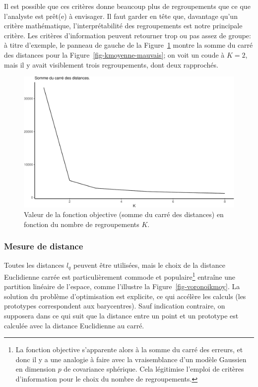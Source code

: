 \documentclass[
  11pt,
  letterpaper,
]{book}
\theoremstyle{definition}
\theoremstyle{remark}
\begin{document}
Il est possible que ces critères donne beaucoup plus de regroupements
que ce que l'analyste est prêt(e) à envisager. Il faut garder en tête
que, davantage qu'un critère mathématique, l'interprétabilité des
regroupements est notre principale critère. Les critères d'information
peuvent retourner trop ou pas assez de groupe: à titre d'exemple, le
panneau de gauche de la Figure~\ref{fig-coudekmoy} montre la somme du
carré des distances pour la Figure~\ref{fig-kmoyenne-mauvais}; on voit
un coude à \(K=2\), mais il y avait visiblement trois regroupements,
dont deux rapprochés.

\begin{figure}[ht!]

{\centering \includegraphics[width=1\textwidth,height=\textheight]{./03-regroupements_files/figure-pdf/fig-coudekmoy-1.pdf}

}

\caption{\label{fig-coudekmoy}Valeur de la fonction objective (somme du
carré des distances) en fonction du nombre de regroupements \(K\).}

\end{figure}

\hypertarget{mesure-de-distance}{%
\subsubsection*{Mesure de distance}\label{mesure-de-distance}}

Toutes les distances \(l_q\) peuvent être utilisées, mais le choix de la
distance Euclidienne carrée est particulièrement commode et
populaire\footnote{La fonction objective s'apparente alors à la somme du
  carré des erreurs, et donc il y a une analogie à faire avec la
  vraisemblance d'un modèle Gaussien en dimension \(p\) de covariance
  sphérique. Cela légitimise l'emploi de critères d'information pour le
  choix du nombre de regroupements.} entraîne une partition linéaire de
l'espace, comme l'illustre la Figure~\ref{fig-voronoikmoy}. La solution
du problème d'optimisation est explicite, ce qui accélère les calculs
(les prototypes correspondent aux barycentres). Sauf indication
contraire, on supposera dans ce qui suit que la distance entre un point
et un prototype est calculée avec la distance Euclidienne au carré.
\end{document}
